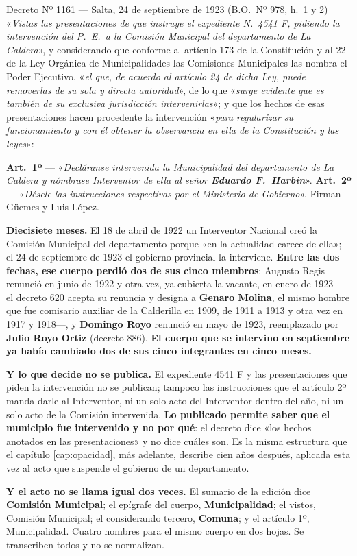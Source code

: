 \begin{ficha}{Decreto Nº 1161 --- Salta, 24 de septiembre de 1923 (B.O.\ Nº 978, h.\ 1 y 2)}
«\textit{Vistas las presentaciones de que instruye el expediente N.\ 4541 F, pidiendo la
intervención del P.\ E.\ a la Comisión Municipal del departamento de La Caldera}», y
considerando que conforme al artículo 173 de la Constitución y al 22 de la Ley Orgánica de
Municipalidades las Comisiones Municipales las nombra el Poder Ejecutivo, «\textit{el que, de
acuerdo al artículo 24 de dicha Ley, puede removerlas de su sola y directa autoridad}», de lo
que «\textit{surge evidente que es también de su exclusiva jurisdicción intervenirlas}»; y que
los hechos de esas presentaciones hacen procedente la intervención «\textit{para regularizar su
funcionamiento y con él obtener la observancia en ella de la Constitución y las leyes}»:

\textbf{Art.\ 1º} --- «\textit{Decláranse intervenida la Municipalidad del departamento de La
Caldera y nómbrase Interventor de ella al señor \textbf{Eduardo F.\ Harbin}}».
\textbf{Art.\ 2º} --- «\textit{Désele las instrucciones respectivas por el Ministerio de
Gobierno}». Firman Güemes y Luis López.
\end{ficha}

\begin{cautela}
\textbf{Diecisiete meses.} El 18 de abril de 1922 un Interventor Nacional creó la Comisión
Municipal del departamento porque «en la actualidad carece de ella»; el 24 de septiembre de 1923
el gobierno provincial la interviene. \textbf{Entre las dos fechas, ese cuerpo perdió dos de sus
cinco miembros}: Augusto Regis renunció en junio de 1922 y otra vez, ya
cubierta la vacante, en enero de 1923 ---el decreto 620 acepta su renuncia y designa a
\textbf{Genaro Molina}, el mismo hombre que fue comisario auxiliar de la Calderilla en 1909, de
1911 a 1913 y otra vez en 1917 y 1918---, y \textbf{Domingo Royo} renunció en mayo de 1923, reemplazado por
\textbf{Julio Royo Ortiz} (decreto 886). \textbf{El cuerpo que se intervino en septiembre ya
había cambiado dos de sus cinco integrantes en cinco meses.}

\textbf{Y lo que decide no se publica.} El expediente 4541 F y las presentaciones que piden la
intervención no se publican; tampoco las instrucciones que el artículo 2º manda darle al
Interventor, ni un solo acto del Interventor dentro del año, ni un solo acto de la Comisión
intervenida. \textbf{Lo publicado permite saber que el municipio fue intervenido y no por qué}:
el decreto dice «los hechos anotados en las presentaciones» y no dice cuáles son. Es la misma
estructura que el capítulo \ref{cap:opacidad}, más adelante, describe cien años después, aplicada esta vez al
acto que suspende el gobierno de un departamento.

\textbf{Y el acto no se llama igual dos veces.} El sumario de la edición dice \textbf{Comisión
Municipal}; el epígrafe del cuerpo, \textbf{Municipalidad}; el vistos, Comisión Municipal; el
considerando tercero, \textbf{Comuna}; y el artículo 1º, Municipalidad. Cuatro nombres para el
mismo cuerpo en dos hojas. Se transcriben todos y no se normalizan.
\end{cautela}

